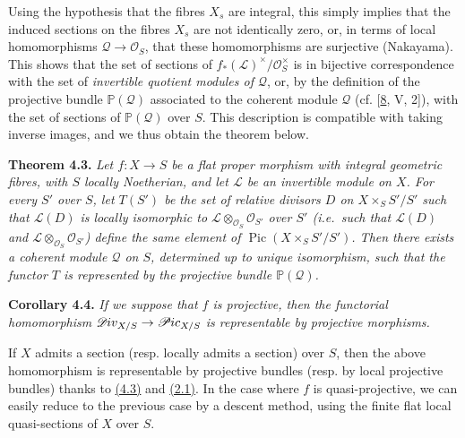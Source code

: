 \documentclass{article}
\newenvironment{itenv}[1]
  {\phantomsection\par\smallskip\noindent\textbf{#1.}\itshape}
  {\par\smallskip}
\newcommand{\oldpage}[1]{\marginpar{\footnotesize$\Big\vert$ \textit{p.~#1}}}
\theoremstyle{definition}
\theoremstyle{definition}
\theoremstyle{definition}
\theoremstyle{definition}
\theoremstyle{remark}
\begin{document}
\oldpage{232-11}Using the hypothesis that the fibres \(X_s\) are integral, this simply implies that the induced sections on the fibres \(X_s\) are not identically zero, or, in terms of local homomorphisms \({\mathscr{Q}}\to{\mathscr{O}}_S\), that these homomorphisms are surjective (Nakayama).
This shows that the set of sections of \(f_*({\mathscr{L}})^\times/{\mathscr{O}}_S^\times\) is in bijective correspondence with the set of \emph{invertible quotient modules of \({\mathscr{Q}}\)}, or, by the definition of the projective bundle \(\mathbb{P}({\mathscr{Q}})\) associated to the coherent module \({\mathscr{Q}}\) (cf. {[}\protect\hyperlink{ref-Gro1960a}{8}, V, 2{]}), with the set of sections of \(\mathbb{P}({\mathscr{Q}})\) over \(S\).
This description is compatible with taking inverse images, and we thus obtain the theorem below.

\leavevmode{}%
\begin{itenv}{Theorem 4.3}
Let \(f\colon X\to S\) be a flat proper morphism with integral geometric fibres, with \(S\) locally Noetherian, and let \({\mathscr{L}}\) be an invertible module on \(X\).
For every \(S'\) over \(S\), let \(T(S')\) be the set of relative divisors \(D\) on \(X\times_S S'/S'\) such that \({\mathscr{L}}(D)\) is locally isomorphic to \({\mathscr{L}}\otimes_{{\mathscr{O}}_S}{\mathscr{O}}_{S'}\) over \(S'\) (i.e.~such that \({\mathscr{L}}(D)\) and \({\mathscr{L}}\otimes_{{\mathscr{O}}_S}{\mathscr{O}}_{S'}\)) define the same element of \(\operatorname{Pic}(X\times_S S'/S')\).
Then there exists a coherent module \({\mathscr{Q}}\) on \(S\), determined up to unique isomorphism, such that the functor \(T\) is represented by the projective bundle \(\mathbb{P}({\mathscr{Q}})\).

\end{itenv}

\leavevmode{}%
\begin{itenv}{Corollary 4.4}
If we suppose that \(f\) is projective, then the functorial homomorphism \(\mathscr{D}\kern -.5pt iv_{X/S}\to\mathscr{P}\kern -.5pt ic_{X/S}\) is representable by projective morphisms.

\end{itenv}

If \(X\) admits a section (resp. locally admits a section) over \(S\), then the above homomorphism is representable by projective bundles (resp. by local projective bundles) thanks to \protect\hyperlink{fga-3-v-theorem-4.3}{(4.3)} and \protect\hyperlink{fga-3-v-proposition-2.1}{(2.1)}.
In the case where \(f\) is quasi-projective, we can easily reduce to the previous case by a descent method, using the finite flat local quasi-sections of \(X\) over \(S\).
\end{document}
